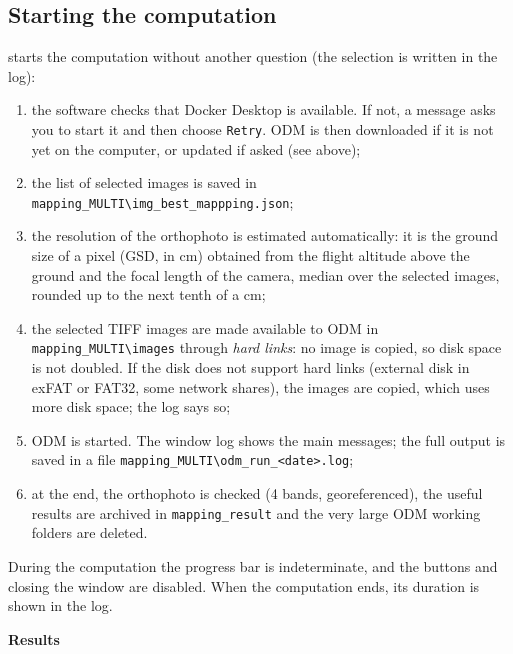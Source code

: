 \documentclass[a4paper,11pt]{report}
\DeclareRobustCommand{\bouton}[1]{\texorpdfstring{\fbox{\small\textsf{#1}}}{#1}}
\begin{document}
\subsection{Starting the computation}
\bouton{Build the map} starts the computation without another question (the selection is written in the log):
\begin{enumerate}
	\item the software checks that Docker Desktop is available. If not, a message asks you to start it and then choose \texttt{Retry}. ODM is then downloaded if it is not yet on the computer, or updated if asked (see above);
	\item the list of selected images is saved in \texttt{mapping\_MULTI\textbackslash img\_best\_mappping.json};
	\item the resolution of the orthophoto is estimated automatically: it is the ground size of a pixel (GSD, in cm) obtained from the flight altitude above the ground and the focal length of the camera, median over the selected images, rounded up to the next tenth of a cm;
	\item the selected TIFF images are made available to ODM in \texttt{mapping\_MULTI\textbackslash images} through \emph{hard links}: no image is copied, so disk space is not doubled. If the disk does not support hard links (external disk in exFAT or FAT32, some network shares), the images are copied, which uses more disk space; the log says so;
	\item ODM is started. The window log shows the main messages; the full output is saved in a file \texttt{mapping\_MULTI\textbackslash odm\_run\_<date>.log};
	\item at the end, the orthophoto is checked (4 bands, georeferenced), the useful results are archived in \texttt{mapping\_result} and the very large ODM working folders are deleted.
\end{enumerate}
During the computation the progress bar is indeterminate, and the buttons and closing the window are disabled. When the computation ends, its duration is shown in the log.

\textbf{Results}\label{sec:step6_mapping_result}
\end{document}
